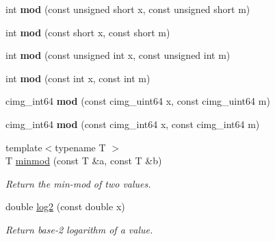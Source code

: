 \begin{DoxyCompactItemize}
int {\bfseries mod} (const unsigned short x, const unsigned short m)
\item 
\mbox{\label{namespacecimg__library__suffixed_1_1cimg_a5bac7fb02f8b0b7f0436b2f58ae2e5e6}} 
int {\bfseries mod} (const short x, const short m)
\item 
\mbox{\label{namespacecimg__library__suffixed_1_1cimg_af5377d20e562b9a0eced0d2066b3c8ba}} 
int {\bfseries mod} (const unsigned int x, const unsigned int m)
\item 
\mbox{\label{namespacecimg__library__suffixed_1_1cimg_ab87d2b561c521c920cd9f2143d222435}} 
int {\bfseries mod} (const int x, const int m)
\item 
\mbox{\label{namespacecimg__library__suffixed_1_1cimg_a2dbd8f870f77ce3b10731130ce059498}} 
cimg\+\_\+int64 {\bfseries mod} (const cimg\+\_\+uint64 x, const cimg\+\_\+uint64 m)
\item 
\mbox{\label{namespacecimg__library__suffixed_1_1cimg_ad3daae7244a90ad300eea619397db898}} 
cimg\+\_\+int64 {\bfseries mod} (const cimg\+\_\+int64 x, const cimg\+\_\+int64 m)
\item 
{\footnotesize template$<$typename T $>$ }\\T \hyperlink{namespacecimg__library__suffixed_1_1cimg_ac9630aa9259053d209c7ff02823efda0}{minmod} (const T \&a, const T \&b)
\begin{DoxyCompactList}\small\item\em Return the min-\/mod of two values. \end{DoxyCompactList}\item 
\mbox{\label{namespacecimg__library__suffixed_1_1cimg_a03657cf098d3b588e76bcef4426233bd}} 
double \hyperlink{namespacecimg__library__suffixed_1_1cimg_a03657cf098d3b588e76bcef4426233bd}{log2} (const double x)
\begin{DoxyCompactList}\small\item\em Return base-\/2 logarithm of a value. \end{DoxyCompactList}\item 

\end{DoxyCompactItemize}
